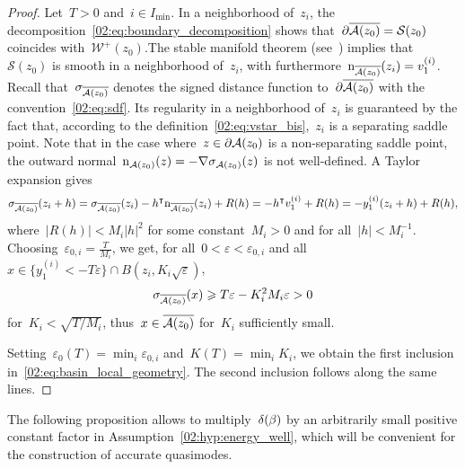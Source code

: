             \begin{proof}
                Let~$T>0$ and~$i\in I_{\min}$. In a neighborhood of~$z_i$, the decomposition~\eqref{02:eq:boundary_decomposition} shows that~$\partial \overline{\mathcal{A}(z_0)} = \mathcal S(z_0)$ coincides with~$\mathcal W^{+}(z_0)$.The stable manifold theorem (see~\cite[Section 9.2]{T24}) implies that~$\mathcal S(z_0)$ is smooth in a neighborhood of~$z_i$, with furthermore~$\mathrm{n}_{\overline{\mathcal{A}(z_0)}}(z_i) = v^{(i)}_{1}$.
                Recall that~$\sigma_{\overline{\mathcal{A}(z_0)}}$ denotes the signed distance function to~$\partial\overline{\mathcal{A}(z_0)}$ with the convention~\eqref{02:eq:sdf}. Its regularity in a neighborhood of~$z_i$ is guaranteed by the fact that, according to the definition~\eqref{02:eq:vstar_bis},~$z_i$ is a separating saddle point.
                Note that in the case where~$z\in\partial \mathcal{A}(z_0)$ is a non-separating saddle point, the outward normal~$\mathrm{n}_{\mathcal{A}(z_0)}(z) = -\nabla \sigma_{\mathcal{A}(z_0)}(z)$ is not well-defined.
                A Taylor expansion gives
                \[\sigma_{\overline{\mathcal{A}(z_0)}}(z_i+h) = \sigma_{\overline{\mathcal{A}(z_0)}}(z_i) -h^\intercal\mathrm{n}_{\overline{\mathcal{A}(z_0)}}(z_i) + R(h) = -h^\intercal v^{(i)}_{1} + R(h) = -y_1^{(i)}(z_i+h)+R(h),\]
                where~$|R(h)| < M_i|h|^2$ for some constant~$M_i>0$ and for all~$|h| < M_i^{-1}$. 
                Choosing~$\varepsilon_{0,i}=\frac{T}{M_i}$, we get, for all~$0<\varepsilon<\varepsilon_{0,i}$ and all~$x\in\{y_1^{(i)} < -T\varepsilon\}\cap B(z_i,K_i\sqrt\varepsilon)$,
                \begin{equation}
                    \sigma_{\overline{\mathcal{A}(z_0)}}(x) \geqslant T\varepsilon - K_i^2M_i\varepsilon > 0
                \end{equation}
                for~$K_i<\sqrt{T/M_i}$, thus~$x\in\overline{\mathcal{A}(z_0)}$ for~$K_i$ sufficiently small.
                
                Setting~$\varepsilon_0(T)=\min_i\varepsilon_{0,i}$ and~$K(T) =\min_i K_i$, we obtain the first inclusion in~\eqref{02:eq:basin_local_geometry}.
                 The second inclusion follows along the same lines.
            \end{proof}
            The following proposition allows to multiply~$\delta(\beta)$ by an arbitrarily small positive constant factor in Assumption~\eqref{02:hyp:energy_well}, which will be convenient for the construction of accurate quasimodes.
